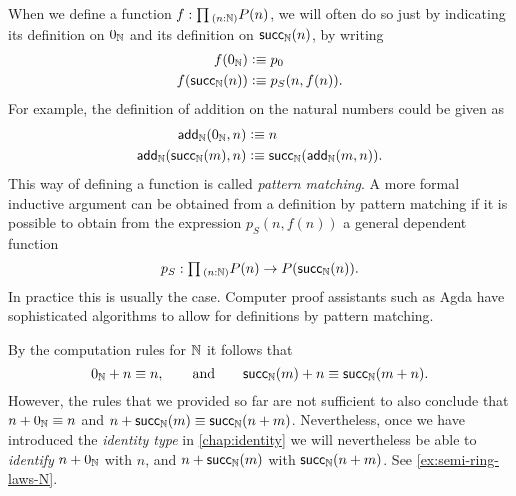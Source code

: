 \begin{rmk}
  When we define a function $f:\prd{n:\N} P(n)$, we will often do so just by indicating its definition on $0_{{\mathbb{N}}}$ and its definition on $\mathsf{succ}_{{\mathbb{N}}}(n)$, by writing
  \begin{align*}
    f(0_{{\mathbb{N}}}) & \vcentcolon\equiv p_0 \\
    f(\mathsf{succ}_{{\mathbb{N}}}(n)) & \vcentcolon\equiv p_S(n,f(n)).
  \end{align*}
  For example, the definition of addition on the natural numbers could be given as
  \begin{align*}
    \mathsf{add_{{\mathbb{N}}}}(0_{{\mathbb{N}}},n) & \vcentcolon\equiv n \\
    \mathsf{add_{{\mathbb{N}}}}(\mathsf{succ}_{{\mathbb{N}}}(m),n) & \vcentcolon\equiv \mathsf{succ}_{{\mathbb{N}}}(\mathsf{add_{{\mathbb{N}}}}(m,n)).
  \end{align*}
  This way of defining a function is called \emph{pattern matching}. A more formal inductive argument can be obtained from a definition by pattern matching if it is possible to obtain from the expression $p_S(n,f(n))$ a general dependent function
  \begin{equation*}
    p_S : \prd{n:\N} P(n)\to P(\succN(n)).
  \end{equation*}
  In practice this is usually the case. Computer proof assistants such as Agda have sophisticated algorithms to allow for definitions by pattern matching.
\end{rmk}

\begin{rmk}
  By the computation rules for ${\mathbb{N}}$ it follows that
  \begin{equation*}
    0_{{\mathbb{N}}}+n\equiv n,\qquad\text{and}\qquad \mathsf{succ}_{{\mathbb{N}}}(m)+n\equiv\mathsf{succ}_{{\mathbb{N}}}(m+n).
  \end{equation*}
  However, the rules that we provided so far are not sufficient to also conclude that $n+0_{{\mathbb{N}}}\equiv n$ and $n+ \mathsf{succ}_{{\mathbb{N}}}(m)\equiv \mathsf{succ}_{{\mathbb{N}}}(n+m)$. Nevertheless, once we have introduced the \emph{identity type} in \cref{chap:identity} we will nevertheless be able to \emph{identify} $n+0_{{\mathbb{N}}}$ with $n$, and $n+ \mathsf{succ}_{{\mathbb{N}}}(m)$ with $\mathsf{succ}_{{\mathbb{N}}}(n+m)$. See \cref{ex:semi-ring-laws-N}. 
\end{rmk}

